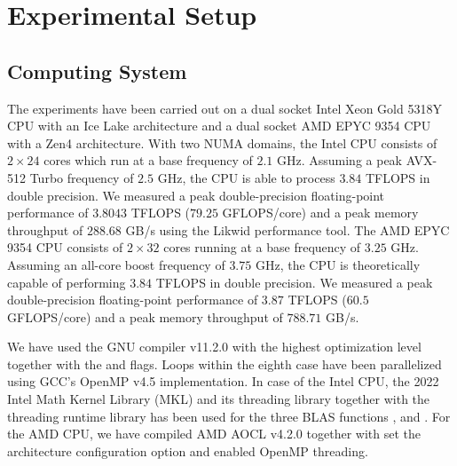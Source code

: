 \section{Experimental Setup}
\label{sec:experimental.setup}

\begin{table*}[t]

\caption%
{%
\footnotesize
Tensor data sets used in 
The table presents the minimum, median, and maximum runtime performances in GFLOPS/core alongside the median speedup of TLIB compared to other libraries.
The tests were conducted on an Intel Xeon Gold 5318Y CPU (left) and an AMD EPYC 9354 CPU (right). 
The performance values on the upper and lower rows of one table were evaluated using asymmetrically and symmetrically shaped tensors, respectively. 
}
\label{tab:dataset}
\end{table*}



\subsection{Computing System} 
The experiments have been carried out on a dual socket Intel Xeon Gold 5318Y CPU with an Ice Lake architecture and a dual socket AMD EPYC 9354 CPU with a Zen4 architecture.
With two NUMA domains, the Intel CPU consists of $2\times24$ cores which run at a base frequency of $2.1$ GHz.
Assuming a peak AVX-512 Turbo frequency of $2.5$ GHz, the CPU is able to process $3.84$ TFLOPS in double precision.
We measured a peak double-precision floating-point performance of $3.8043$ TFLOPS ($79.25$ GFLOPS/core) and a peak memory throughput of $288.68$ GB/s using the Likwid performance tool.
The AMD EPYC 9354 CPU consists of $2\times32$ cores running at a base frequency of $3.25$ GHz.
Assuming an all-core boost frequency of $3.75$ GHz, the CPU is theoretically capable of performing $3.84$ TFLOPS in double precision.
We measured a peak double-precision floating-point performance of $3.87$ TFLOPS ($60.5$ GFLOPS/core) and a peak memory throughput of $788.71$ GB/s.
 
We have used the GNU compiler v11.2.0 with the highest optimization level  together with the  and  flags. 
Loops within the eighth case have been parallelized using GCC's OpenMP v4.5 implementation.
In case of the Intel CPU, the 2022 Intel Math Kernel Library (MKL) and its threading library  together with the threading runtime library  has been used for the three BLAS functions ,  and .
For the AMD CPU, we have compiled AMD AOCL v4.2.0 together with set the  architecture configuration option and enabled OpenMP threading.


